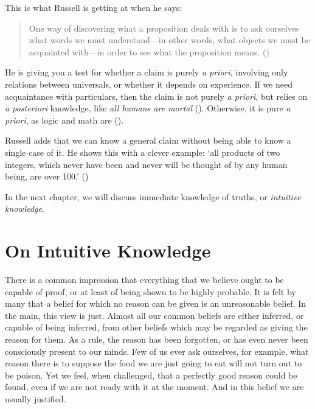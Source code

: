 \documentclass[oneside,letterpaper,12pt]{book}
\begin{document}
This is what Russell is getting at when he says:
\begin{quote}
	One way of discovering what a proposition deals with is to ask ourselves what words we must understand---in other words, what objects we must be acquainted with---in order to see what the proposition means. (\pageref{discovering})
\end{quote} 
He is giving you a test for whether a claim is purely \textit{a priori}, involving only relations between universals, or whether it depends on experience. If we need acquaintance with particulars, then the claim is not purely \textit{a priori}, but relies on \textit{a posteriori} knowledge, like \textit{all humans are mortal} (\pageref{mortal}). Otherwise, it is pure \textit{a priori}, as logic and math are (\pageref{logic}).

Russell adds that we can know a general claim without being able to know a single case of it. He shows this with a clever example: `all products of two integers, which never have been and never will be thought of by any human being, are over 100.' (\pageref{single})

In the next chapter, we will discuss immediate knowledge of truths, or \textit{intuitive knowledge}.

\hypertarget{chapter-xi.-on-intuitive-knowledge}{%
\chapter{On Intuitive Knowledge}\label{chapter-xi.-on-intuitive-knowledge}}

There is a common impression that everything that we believe ought to be
capable of proof, or at least of being shown to be highly probable. It
is felt by many that a belief for which no reason can be given is an
unreasonable belief. In the main, this view is just. Almost all our
common beliefs are either inferred, or capable of being inferred, from
other beliefs which may be regarded as giving the reason for them. As a
rule, the reason has been forgotten, or has even never been consciously
present to our minds. Few of us ever ask ourselves, for example, what
reason there is to suppose the food we are just going to eat will not
turn out to be poison. Yet we feel, when challenged, that a perfectly
good reason could be found, even if we are not ready with it at the
moment. And in this belief we are usually justified.
\end{document}
